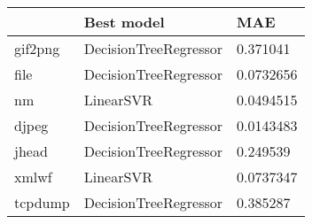 \begin{tabular}{lll}
\toprule
{} &             Best model &        MAE \\
\midrule
gif2png &  DecisionTreeRegressor &   0.371041 \\
file    &  DecisionTreeRegressor &  0.0732656 \\
nm      &              LinearSVR &  0.0494515 \\
djpeg   &  DecisionTreeRegressor &  0.0143483 \\
jhead   &  DecisionTreeRegressor &   0.249539 \\
xmlwf   &              LinearSVR &  0.0737347 \\
tcpdump &  DecisionTreeRegressor &   0.385287 \\
\bottomrule
\end{tabular}

